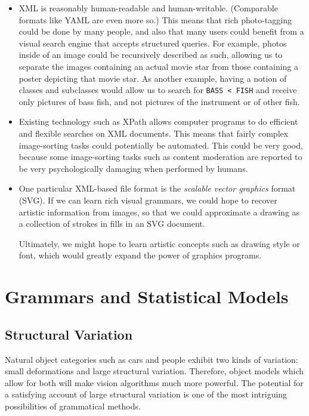 \begin{itemize}
\item XML is reasonably human-readable and human-writable. (Comparable
  formats like YAML are even more so.) This means that rich
  photo-tagging could be done by many people, and also that many users
  could benefit from a visual search engine that accepts structured
  queries. For example, photos inside of an image could be recursively
  described as such, allowing us to separate the images containing an
  actual movie star from those containing a poster depicting that
  movie star. As another example, having a notion of classes and
  subclasses would allow us to search for \texttt{BASS < FISH} and
  receive only pictures of bass fish, and not pictures of the
  instrument or of other fish.

\item Existing technology such as XPath allows computer programs to do
  efficient and flexible searches on XML documents. This means that
  fairly complex image-sorting tasks could potentially be automated.
  This could be very good, because some image-sorting tasks such as
  content moderation are reported to be very psychologically
  damaging when performed by humans.

\item One particular XML-based file format is the \emph{scalable
    vector graphics} format (SVG). If we can learn rich visual
  grammars, we could hope to recover artistic information from images,
  so that we could approximate a drawing as a collection of strokes in
  fills in an SVG document.

  Ultimately, we might hope to learn artistic concepts such as drawing
  style or font, which would greatly expand the power of graphics
  programs.
\end{itemize}

\section{Grammars and Statistical Models}

\subsection{Structural Variation}
\label{sec-structural}

Natural object categories such as cars and people exhibit two kinds of
variation: small deformations and large structural
variation. Therefore, object models which allow for both will make
vision algorithms much more powerful.  The potential for a satisfying
account of large structural variation is one of the most intriguing
possibilities of grammatical methods.

